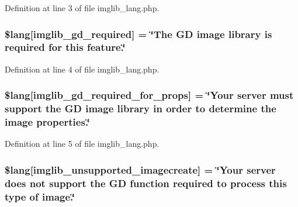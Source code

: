 Definition at line 3 of file imglib\+\_\+lang.\+php.

\subsubsection[{\texorpdfstring{\$lang}{$lang}}]{\setlength{\rightskip}{0pt plus 5cm}\$lang\mbox{[}\textquotesingle{}imglib\+\_\+gd\+\_\+required\textquotesingle{}\mbox{]} = \char`\"{}The GD image library is required {\bf for} {\bf this} feature.\char`\"{}}\hypertarget{system_2language_2english_2imglib__lang_8php_aa8d7f8276e62fbe759daef2021c16552}{}\label{system_2language_2english_2imglib__lang_8php_aa8d7f8276e62fbe759daef2021c16552}


Definition at line 4 of file imglib\+\_\+lang.\+php.

\subsubsection[{\texorpdfstring{\$lang}{$lang}}]{\setlength{\rightskip}{0pt plus 5cm}\$lang\mbox{[}\textquotesingle{}imglib\+\_\+gd\+\_\+required\+\_\+for\+\_\+props\textquotesingle{}\mbox{]} = \char`\"{}Your server must support the GD image library in order to determine the image properties.\char`\"{}}\hypertarget{system_2language_2english_2imglib__lang_8php_a0da9c99f9e2b5f38ccbefb9d9f702c5e}{}\label{system_2language_2english_2imglib__lang_8php_a0da9c99f9e2b5f38ccbefb9d9f702c5e}


Definition at line 5 of file imglib\+\_\+lang.\+php.

\subsubsection[{\texorpdfstring{\$lang}{$lang}}]{\setlength{\rightskip}{0pt plus 5cm}\$lang\mbox{[}\textquotesingle{}imglib\+\_\+unsupported\+\_\+imagecreate\textquotesingle{}\mbox{]} = \char`\"{}Your server does not support the GD function required to process {\bf this} {\bf type} of image.\char`\"{}}\hypertarget{system_2language_2english_2imglib__lang_8php_ace032cbe8dafb1f3417a758d0914ecdb}{}\label{system_2language_2english_2imglib__lang_8php_ace032cbe8dafb1f3417a758d0914ecdb}


